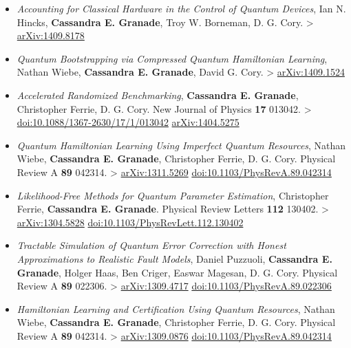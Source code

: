 \documentclass[]{article}
\begin{document}
\begin{itemize}
\item
  \emph{Accounting for Classical Hardware in the Control of Quantum
  Devices}, Ian N. Hincks, \textbf{Cassandra E. Granade}, Troy W.
  Borneman, D. G. Cory. \textgreater{}
  \href{https://scirate.com/arxiv/1409.8178}{arXiv:1409.8178}
\item
  \emph{Quantum Bootstrapping via Compressed Quantum Hamiltonian
  Learning}, Nathan Wiebe, \textbf{Cassandra E. Granade}, David G.
  Cory. \textgreater{}
  \href{https://scirate.com/arxiv/1409.1524}{arXiv:1409.1524}
\item
  \emph{Accelerated Randomized Benchmarking}, \textbf{Cassandra E.
  Granade}, Christopher Ferrie, D. G. Cory. New Journal of Physics
  \textbf{17} 013042. \textgreater{}
  \href{http://dx.doi.org/10.1088/1367-2630/17/1/013042}{doi:10.1088/1367-2630/17/1/013042}
  \textbar{} \href{http://arxiv.org/abs/1404.5275}{arXiv:1404.5275}
\item
  \emph{Quantum Hamiltonian Learning Using Imperfect Quantum Resources},
  Nathan Wiebe, \textbf{Cassandra E. Granade}, Christopher Ferrie, D.
  G. Cory. Physical Review A \textbf{89} 042314. \textgreater{}
  \href{http://arxiv.org/abs/1311.5269}{arXiv:1311.5269} \textbar{}
  \href{http://dx.doi.org/10.1103/PhysRevA.89.042314}{doi:10.1103/PhysRevA.89.042314}
\item
  \emph{Likelihood-Free Methods for Quantum Parameter Estimation},
  Christopher Ferrie, \textbf{Cassandra E. Granade}. Physical Review
  Letters \textbf{112} 130402. \textgreater{}
  \href{http://arxiv.org/abs/1304.5828}{arXiv:1304.5828} \textbar{}
  \href{http://dx.doi.org/10.1103/PhysRevLett.112.130402}{doi:10.1103/PhysRevLett.112.130402}
\item
  \emph{Tractable Simulation of Quantum Error Correction with Honest
  Approximations to Realistic Fault Models}, Daniel Puzzuoli,
  \textbf{Cassandra E. Granade}, Holger Haas, Ben Criger, Easwar
  Magesan, D. G. Cory. Physical Review A \textbf{89} 022306.
  \textgreater{} \href{http://arxiv.org/abs/1309.4717}{arXiv:1309.4717}
  \textbar{}
  \href{http://dx.doi.org/10.1103/PhysRevA.89.022306}{doi:10.1103/PhysRevA.89.022306}
\item
  \emph{Hamiltonian Learning and Certification Using Quantum Resources},
  Nathan Wiebe, \textbf{Cassandra E. Granade}, Christopher Ferrie, D.
  G. Cory. Physical Review A \textbf{89} 042314. \textgreater{}
  \href{http://arxiv.org/abs/1309.0876}{arXiv:1309.0876} \textbar{}
  \href{http://dx.doi.org/10.1103/PhysRevA.89.042314}{doi:10.1103/PhysRevA.89.042314}
\end{itemize}
\end{document}
